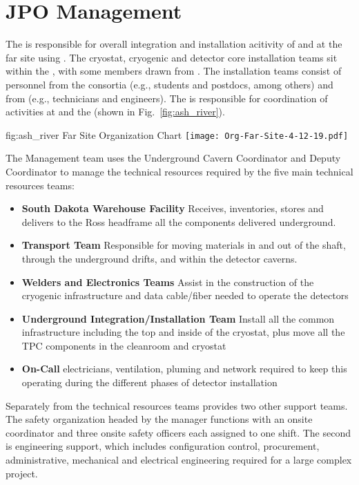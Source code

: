 \section{JPO Management}
\label{vl:tc-facility_mgmt}

The  is responsible for overall integration and
installation acitivity of  and  at the far
site using . The cryostat, cryogenic and detector core
installation teams sit within the , with some members drawn
from . The installation teams consist of personnel from the
consortia (e.g., students and postdocs, among others) and from
 (e.g., technicians and engineers). The  is responsible
for coordination of activities at  and the  
(shown in Fig.~\ref{fig:ash_river}).
\begin{dunefigure}{fig:ash_river}
  {Far Site Organization Chart}
  \texttt{[image: Org-Far-Site-4-12-19.pdf]}
\end{dunefigure}


The  Management team uses the Underground Cavern Coordinator and
Deputy Coordinator to manage the technical resources required by the
five main technical resources teams:
\begin{itemize}
\item {\bf South Dakota Warehouse Facility} Receives, inventories,
  stores and delivers to the Ross headframe all the components
  delivered underground.
 \item {\bf Transport Team} Responsible for moving materials in and out
   of the shaft, through the underground drifts, and within the
   detector caverns.
 \item {\bf Welders and Electronics Teams} Assist in the construction of
   the cryogenic infrastructure and data cable/fiber needed to operate
   the detectors
 \item {\bf Underground Integration/Installation Team} Install all the
   common infrastructure including the top and inside of the cryostat,
   plus move all the TPC components in the cleanroom and cryostat
 \item {\bf On-Call} electricians, ventilation, pluming and network
   required to keep this operating during the different phases of
   detector installation
\end{itemize}

Separately from the technical resources teams  provides two
other support teams.  The safety organization headed by the
  manager functions with an
onsite  coordinator and three onsite safety officers each
assigned to one shift.  The second is engineering support, which
includes configuration control, procurement, administrative,
mechanical and electrical engineering required for a large complex
project.

